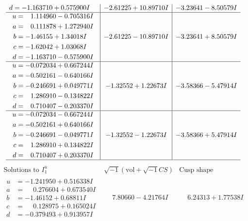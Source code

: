 \documentclass[1p]{elsarticle_modified}
\theoremstyle{definition}
\newcommand{\I}{\sqrt{-1}}
\begin{document}
$$\begin{array}{c|c|c}
\begin{aligned}
d &= -1.163710 + 0.575900 I\end{aligned}
 & -2.61225 + 10.89710 I & -3.23641 - 8.50579 I \\ \hline\begin{aligned}
u &= \phantom{-}1.114960 - 0.705316 I \\
a &= \phantom{-}0.111878 + 1.272940 I \\
b &= -1.46155 + 1.34018 I \\
c &= -1.62042 + 1.03068 I \\
d &= -1.163710 - 0.575900 I\end{aligned}
 & -2.61225 - 10.89710 I & -3.23641 + 8.50579 I \\ \hline\begin{aligned}
u &= -0.072034 + 0.667244 I \\
a &= -0.502161 - 0.640166 I \\
b &= -0.246691 + 0.049771 I \\
c &= \phantom{-}1.286910 - 0.134822 I \\
d &= \phantom{-}0.710407 - 0.203370 I\end{aligned}
 & -1.32552 + 1.22673 I & -3.58366 - 5.47914 I \\ \hline\begin{aligned}
u &= -0.072034 - 0.667244 I \\
a &= -0.502161 + 0.640166 I \\
b &= -0.246691 - 0.049771 I \\
c &= \phantom{-}1.286910 + 0.134822 I \\
d &= \phantom{-}0.710407 + 0.203370 I\end{aligned}
 & -1.32552 - 1.22673 I & -3.58366 + 5.47914 I\\
 \hline 
 \end{array}$$\newpage$$\begin{array}{c|c|c}  
\text{Solutions to }I^u_{1}& \I (\text{vol} + \sqrt{-1}CS) & \text{Cusp shape}\\
 \hline 
\begin{aligned}
u &= -1.241950 + 0.516338 I \\
a &= \phantom{-}0.276604 + 0.673540 I \\
b &= -1.46152 + 0.68811 I \\
c &= \phantom{-}0.128975 + 0.165024 I \\
d &= -0.379493 + 0.913957 I\end{aligned}
 & \phantom{-}7.80660 - 4.21764 I & \phantom{-}6.24313 + 1.77538 I \\ \hline\begin{aligned}

\end{aligned}
\end{array}$$
\end{document}
